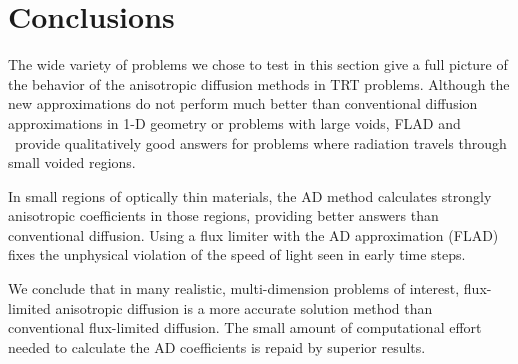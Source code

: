 \begin{comment}
\begin{figure}[htb]
  \centering
  \texttt{[image: trt\_serious/anisotropy]}
  \Caption{Anisotropy of the CRASH-like problem.}{
    In white regions, the FLAD tensor is isotropic, and in red and black
  regions, it is highly anisotropic. The scale is the same as in
  Fig.~\ref{fig:crashaltAnisotropy}.}
  \label{fig:seriousAnisotropy}
\end{figure}

\subsection{Discussion}

\end{comment}


\section{Conclusions}

The wide variety of problems we chose to test in this section give a full
picture of the behavior of the anisotropic diffusion methods in TRT problems.
Although the new approximations do not perform much better than conventional
diffusion approximations in 1-D geometry or problems with large voids, FLAD and
\APone\ provide qualitatively good answers for problems where radiation travels
through small voided regions.

In small regions of optically thin materials, the AD method calculates strongly
anisotropic coefficients in those regions, providing better
answers than conventional diffusion. Using a flux limiter with the AD
approximation (FLAD) fixes the unphysical violation of the speed of light
seen in early time steps.

We conclude that in many realistic, multi-dimension problems of interest,
flux-limited anisotropic diffusion is a more accurate solution method than
conventional flux-limited diffusion. The small amount of computational effort
needed to calculate the AD coefficients is repaid by superior results.
